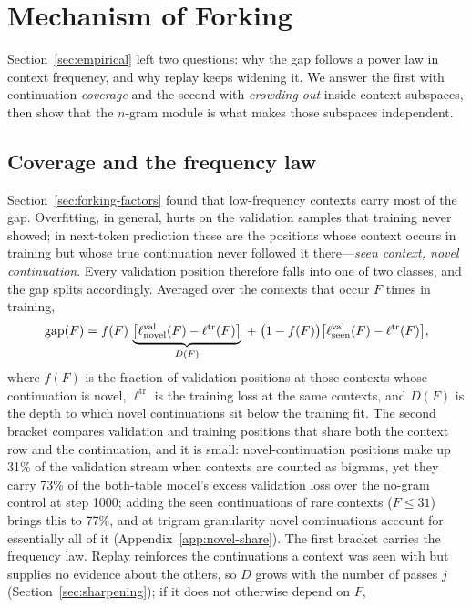 \section{Mechanism of Forking}
\label{sec:mechanism}

Section~\ref{sec:empirical} left two questions: why the gap follows a power law in context frequency, and why replay keeps widening it. We answer the first with continuation \emph{coverage} and the second with \emph{crowding-out} inside context subspaces, then show that the $n$-gram module is what makes those subspaces independent.

\subsection{Coverage and the frequency law}
\label{sec:coverage}
Section~\ref{sec:forking-factors} found that low-frequency contexts carry most of the gap. Overfitting, in general, hurts on the validation samples that training never showed; in next-token prediction these are the positions whose context occurs in training but whose true continuation never followed it there---\emph{seen context, novel continuation}. Every validation position therefore falls into one of two classes, and the gap splits accordingly. Averaged over the contexts that occur $F$ times in training,
\begin{equation}
\operatorname{gap}(F)=f(F)\,\underbrace{\big[\ell^{\mathrm{val}}_{\mathrm{novel}}(F)-\ell^{\mathrm{tr}}(F)\big]}_{D(F)}
\;+\;\big(1-f(F)\big)\big[\ell^{\mathrm{val}}_{\mathrm{seen}}(F)-\ell^{\mathrm{tr}}(F)\big],
\label{eq:gap-decomp}
\end{equation}
where $f(F)$ is the fraction of validation positions at those contexts whose continuation is novel, $\ell^{\mathrm{tr}}$ is the training loss at the same contexts, and $D(F)$ is the depth to which novel continuations sit below the training fit. The second bracket compares validation and training positions that share both the context row and the continuation, and it is small: novel-continuation positions make up 31\% of the validation stream when contexts are counted as bigrams, yet they carry 73\% of the both-table model's excess validation loss over the no-gram control at step 1000; adding the seen continuations of rare contexts ($F\le 31$) brings this to 77\%, and at trigram granularity novel continuations account for essentially all of it (Appendix~\ref{app:novel-share}). The first bracket carries the frequency law. Replay reinforces the continuations a context was seen with but supplies no evidence about the others, so $D$ grows with the number of passes $j$ (Section~\ref{sec:sharpening}); if it does not otherwise depend on $F$,

